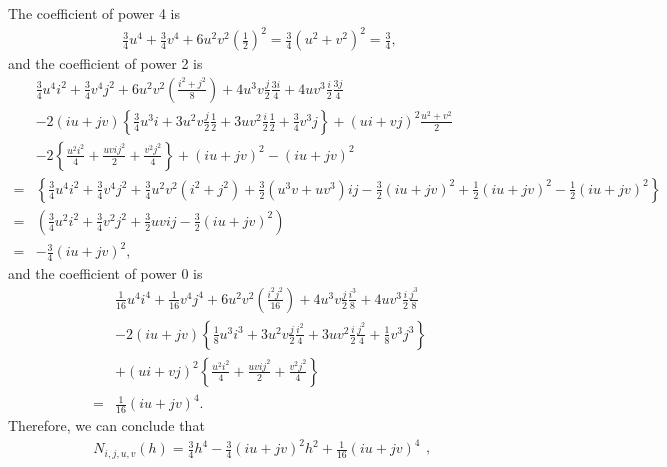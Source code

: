 \documentclass{article}
\begin{document}
\begin{appendices}
	The coefficient of power 4 is 
	\begin{equation*}
		\begin{aligned}
			\frac{3}{4}u^4+\frac{3}{4}v^4+6u^2v^2(\frac{1}{2})^2=\frac{3}{4}(u^2+v^2)^2=\frac{3}{4},
		\end{aligned}
	\end{equation*}
	and the coefficient of power 2 is 
	\begin{equation*}
		\begin{aligned}
			&\frac{3}{4}u^4i^2+\frac{3}{4}v^4j^2+6u^2v^2(\frac{i^2+j^2}{8})+4u^3v\frac{j}{2}\frac{3i}{4}+4uv^3\frac{i}{2}\frac{3j}{4}\\
			&-2(iu+jv)\left\{\frac{3}{4}u^3i+3u^2v\frac{j}{2}\frac{1}{2}+3uv^2\frac{i}{2}\frac{1}{2}+\frac{3}{4}v^3j\right\}+(ui+vj)^2\frac{u^2+v^2}{2}\\
			&-2\left\{\frac{u^2i^2}{4}+\frac{uvij^2}{2}+\frac{v^2j^2}{4}\right\}+(iu+jv)^2-(iu+jv)^2\\
			=&\left\{\frac{3}{4}u^4i^2+\frac{3}{4}v^4j^2+\frac{3}{4}u^2v^2(i^2+j^2)+\frac{3}{2}(u^3v+uv^3)ij-\frac{3}{2}(iu+jv)^2+\frac{1}{2}(iu+jv)^2-\frac{1}{2}(iu+jv)^2\right\}\\
			=&(\frac{3}{4}u^2i^2+\frac{3}{4}v^2j^2+\frac{3}{2}uvij-\frac{3}{2}(iu+jv)^2)\\
			=&-\frac{3}{4}(iu+jv)^2,
		\end{aligned}
	\end{equation*}
	and the coefficient of power 0 is 
	\begin{equation*}
		\begin{aligned}
			&\frac{1}{16}u^4i^4+\frac{1}{16}v^4j^4+6u^2v^2(\frac{i^2j^2}{16})+4u^3v\frac{j}{2}\frac{i^3}{8}+4uv^3\frac{i}{2}\frac{j^3}{8}\\
			&-2(iu+jv)\left\{\frac{1}{8}u^3i^3+3u^2v\frac{j}{2}\frac{i^2}{4}+3uv^2\frac{i}{2}\frac{j^2}{4}+\frac{1}{8}v^3j^3\right\}\\
			&+(ui+vj)^2\left\{\frac{u^2i^2}{4}+\frac{uvij^2}{2}+\frac{v^2j^2}{4}\right\}\\
			=&\frac{1}{16}(iu+jv)^4.
		\end{aligned}
	\end{equation*}
	Therefore, we can conclude that 
	\begin{equation*}
		\begin{aligned}
			N_{i,j,u,v}(h)=\frac{3}{4}h^4-\frac{3}{4}(iu+jv)^2h^2+\frac{1}{16}(iu+jv)^4
		\end{aligned},

\end{equation*}
\end{appendices}
\end{document}
